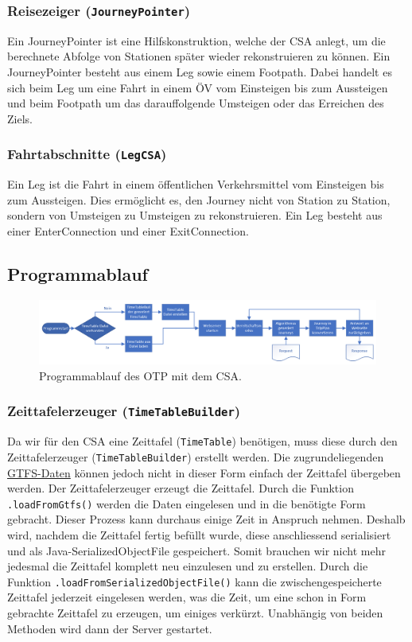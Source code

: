 \subsubsection{Reisezeiger (\texttt{JourneyPointer})}
Ein \hypertarget{journeyPointer}{JourneyPointer} ist eine Hilfskonstruktion, welche der CSA anlegt, um die berechnete Abfolge von Stationen später wieder rekonstruieren zu können. Ein JourneyPointer besteht aus einem Leg sowie einem Footpath. Dabei handelt es sich beim Leg um eine Fahrt in einem ÖV vom Einsteigen bis zum Aussteigen und beim Footpath um das darauffolgende Umsteigen oder das Erreichen des Ziels.

\subsubsection{Fahrtabschnitte (\texttt{LegCSA})}
Ein \hypertarget{leg}{Leg} ist die Fahrt in einem öffentlichen Verkehrsmittel vom Einsteigen bis zum Aussteigen. Dies ermöglicht es, den Journey nicht von Station zu Station, sondern von Umsteigen zu Umsteigen zu rekonstruieren. Ein Leg besteht aus einer EnterConnection und einer ExitConnection. 

\subsection{Programmablauf}
\begin{figure}[htb]
	\centering
	\includegraphics[width=15cm]{img/programmablauf.png}
	\caption{Programmablauf des OTP mit dem CSA.}
	\label{fig:programmablauf}
\end{figure}

\subsubsection{Zeittafelerzeuger (\texttt{TimeTableBuilder})}
Da wir für den CSA eine \hypertarget{timeTableBuilder}{Zeittafel} (\texttt{TimeTable}) benötigen, muss diese durch den Zeittafelerzeuger (\texttt{TimeTableBuilder}) erstellt werden. Die zugrundeliegenden \hyperlink{GTFS}{GTFS-Daten} können jedoch nicht in dieser Form einfach der Zeittafel übergeben werden. Der Zeittafelerzeuger erzeugt die Zeittafel. Durch die Funktion \texttt{.loadFromGtfs()} werden die Daten eingelesen und in die benötigte Form gebracht. Dieser Prozess kann durchaus einige Zeit in Anspruch nehmen. Deshalb wird, nachdem die Zeittafel fertig befüllt wurde, diese anschliessend serialisiert und als Java-SerializedObjectFile gespeichert. Somit brauchen wir nicht mehr jedesmal die Zeittafel komplett neu einzulesen und zu erstellen. Durch die Funktion \texttt{.loadFromSerializedObjectFile()} kann die zwischengespeicherte Zeittafel jederzeit eingelesen werden, was die Zeit, um eine schon in Form gebrachte Zeittafel zu erzeugen, um einiges verkürzt. Unabhängig von beiden Methoden wird dann der Server gestartet.

